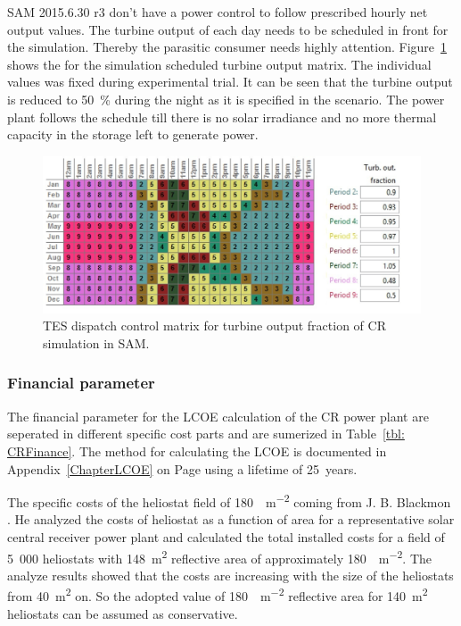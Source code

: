 SAM 2015.6.30 r3 don't have a power control to follow prescribed hourly net output values. The turbine output of each day needs to be scheduled in front for the simulation. Thereby the parasitic consumer needs highly attention. Figure~\ref{CR_turbineoutput} shows the for the simulation scheduled turbine output matrix. The individual values was fixed during experimental trial. It can be seen that the turbine output is reduced to \SI{50}{\percent} during the night as it is specified in the scenario. The power plant follows the schedule till there is no solar irradiance and no more thermal capacity in the storage left to generate power. 
\begin{figure}[htbp]  
\centering
\includegraphics[width=0.95\linewidth]{FIG/CR_turbineoutput}
\caption[TES dispatch control matrix for turbine output fraction of CR simulation in SAM.]{TES dispatch control matrix for turbine output fraction of CR simulation in SAM.}\label{CR_turbineoutput}
\end{figure}
\pagebreak
\subsubsection{Financial parameter}
The financial parameter for the LCOE calculation of the CR power plant are seperated in different specific cost parts and are sumerized in Table~\ref{tbl: CRFinance}. The method for calculating the LCOE is documented in Appendix~\ref{ChapterLCOE} on Page \pageref{ChapterLCOE} using a lifetime of \SI{25}{years}.




The specific costs of the heliostat field of \SI{180}{\usd\per\square\metre} coming from J. B. Blackmon \cite{Blackmon2012}. He analyzed the costs of heliostat as a function of area for a representative solar central receiver power plant and calculated the total installed costs for a field of 5~000 heliostats with \SI{148}{\square\metre} reflective area of approximately \SI{180}{\usd\per\square\metre}. The analyze results showed that the costs are increasing with the size of the heliostats from \SI{40}{\square\metre} on. So the adopted value of \SI{180}{\usd\per\square\metre} reflective area for \SI{140}{\square\metre} heliostats can be assumed as conservative.


